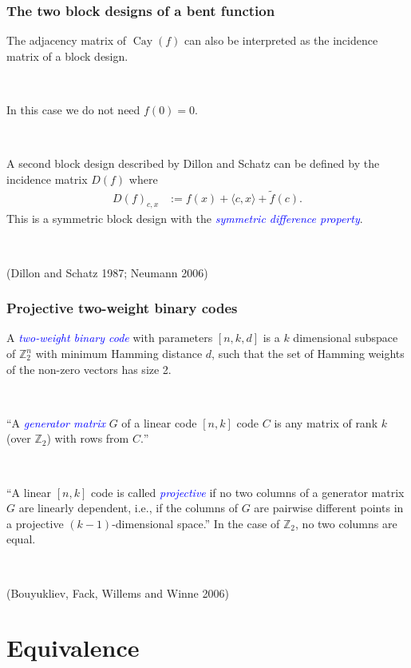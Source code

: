 \documentclass[pdf,sprung,slideColor,nocolorBG]{beamer}
\newenvironment{colortheme}[1]{
\def\ProvidesPackageRCS $##1${\relax}
\renewcommand{\ProcessOptions}{\relax}
\makeatletter

\makeatother
}{}
\newcommand{\slidecite}[1]{\tiny{(#1)}\normalsize{}}
\newcommand{\mb}[1]{\mathbb{#1}}
\newcommand{\Emph}[1]{\emph{\textcolor{blue}{#1}}}
\newcommand{\Cay}[1]{\operatorname{Cay}\left(#1\right)}
\newcommand{\dual}[1]{\widetilde{#1}}
\newcommand{\Z}{\mb{Z}}
\begin{document}
\begin{colortheme}{seagull}
\begin{frame}
\frametitle{The two block designs of a bent function}

The adjacency matrix of $\Cay{f}$ can also be interpreted as the incidence matrix of a block design.

~

In this case we do not need $f(0)=0$.

~
\begin{Definition}
A second block design described by Dillon and Schatz can be defined by the incidence matrix $D(f)$ where
\begin{align*}
D(f)_{c,x} &:= f(x) + \langle c, x \rangle + \dual{f}(c).   
\end{align*}
This is a symmetric block design with the \Emph{symmetric difference property}.
\end{Definition}

~

\slidecite{Dillon and Schatz 1987; Neumann 2006}
\end{frame}
\begin{frame}
\frametitle{Projective two-weight binary codes}

\begin{Definition}
A \Emph{two-weight binary code} with parameters $[n,k,d]$ is a $k$ dimensional subspace of $\Z_2^n$ with 
minimum Hamming distance $d$, such that the set of Hamming weights of the non-zero vectors has size 2.

~

``A \Emph{generator matrix} $G$ of a linear code $[n, k]$ code $C$ is any matrix
of rank $k$ (over $\Z_2$) with rows from $C.$''

~

``A linear $[n, k]$ code is called \Emph{projective} if no two columns of a generator matrix
$G$ are linearly dependent, i.e., if the columns of $G$ are pairwise different points in a
projective $(k-1)$-dimensional space.''
In the case of $\Z_2$, no two columns are equal.

~

\slidecite{Bouyukliev, Fack, Willems and Winne 2006}

\end{Definition}

\end{frame}
\end{colortheme}
\section{Equivalence}
\end{document}
